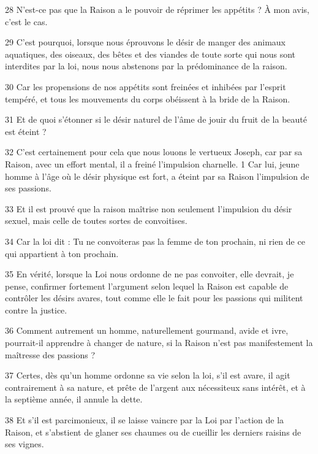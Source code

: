 \par 28 N'est-ce pas que la Raison a le pouvoir de réprimer les appétits ? À mon avis, c'est le cas.

\par 29 C'est pourquoi, lorsque nous éprouvons le désir de manger des animaux aquatiques, des oiseaux, des bêtes et des viandes de toute sorte qui nous sont interdites par la loi, nous nous abstenons par la prédominance de la raison.

\par 30 Car les propensions de nos appétits sont freinées et inhibées par l'esprit tempéré, et tous les mouvements du corps obéissent à la bride de la Raison.

\par 31 Et de quoi s'étonner si le désir naturel de l'âme de jouir du fruit de la beauté est éteint ?

\par 32 C'est certainement pour cela que nous louons le vertueux Joseph, car par sa Raison, avec un effort mental, il a freiné l'impulsion charnelle. 1 Car lui, jeune homme à l'âge où le désir physique est fort, a éteint par sa Raison l'impulsion de ses passions.

\par 33 Et il est prouvé que la raison maîtrise non seulement l'impulsion du désir sexuel, mais celle de toutes sortes de convoitises.

\par 34 Car la loi dit : Tu ne convoiteras pas la femme de ton prochain, ni rien de ce qui appartient à ton prochain.

\par 35 En vérité, lorsque la Loi nous ordonne de ne pas convoiter, elle devrait, je pense, confirmer fortement l'argument selon lequel la Raison est capable de contrôler les désirs avares, tout comme elle le fait pour les passions qui militent contre la justice.

\par 36 Comment autrement un homme, naturellement gourmand, avide et ivre, pourrait-il apprendre à changer de nature, si la Raison n'est pas manifestement la maîtresse des passions ?

\par 37 Certes, dès qu'un homme ordonne sa vie selon la loi, s'il est avare, il agit contrairement à sa nature, et prête de l'argent aux nécessiteux sans intérêt, et à la septième année, il annule la dette.

\par 38 Et s'il est parcimonieux, il se laisse vaincre par la Loi par l'action de la Raison, et s'abstient de glaner ses chaumes ou de cueillir les derniers raisins de ses vignes.

